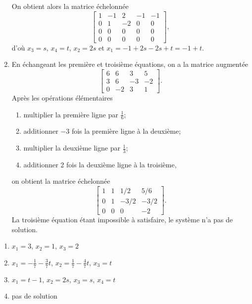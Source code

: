 \begin{exercice}
\begin{sol}
\begin{enumerate}
      On obtient alors la matrice échelonnée
      \begin{displaymath}
        \begin{bmatrix}
           1 & -1 &  2 & -1 & -1 \\
           0 &  1 & -2 &  0 &  0 \\
           0 &  0 &  0 &  0 &  0 \\
           0 &  0 &  0 &  0 &  0
         \end{bmatrix},
      \end{displaymath}
      d'où $x_3 = s$, $x_4 = t$, $x_2 = 2s$ et $x_1 = -1 + 2s - 2s + t
      = -1 + t$.
    \item En échangeant les première et troisième équations, on a la
      matrice augmentée
      \begin{displaymath}
        \begin{bmatrix}
          6 &  6 &  3 &  5 \\
          3 &  6 & -3 & -2 \\
          0 & -2 &  3 &  1
        \end{bmatrix}.
      \end{displaymath}
      Après les opérations élémentaires
      \begin{enumerate}[1.]
      \item multiplier la première ligne par $\frac{1}{6}$;
      \item additionner $-3$ fois la première ligne à la deuxième;
      \item multiplier la deuxième ligne par $\frac{1}{3}$;
      \item additionner 2 fois la deuxième ligne à la troisième,
      \end{enumerate}
      on obtient la matrice échelonnée
      \begin{displaymath}
        \begin{bmatrix}
          1 &  1 &  1/2 &  5/6 \\
          0 &  1 & -3/2 & -3/2 \\
          0 &  0 &    0 &   -2
        \end{bmatrix}.
      \end{displaymath}
      La troisième équation étant impossible à satisfaire, le système
      n'a pas de solution.
    \end{enumerate}
  \end{sol}
  \begin{rep}
    \begin{enumerate}
    \item $x_1 = 3$, $x_2 = 1$, $x_3 = 2$
    \item $x_1 = -\frac{1}{7} - \frac{3}{7}t$,
          $x_2 = \frac{1}{7} -  \frac{4}{7}t$,
          $x_3 = t$
    \item $x_1 = t - 1$, $x_2 = 2s$, $x_3 = s$, $x_4 = t$
    \item pas de solution
    \end{enumerate}
  \end{rep}
\end{exercice}

